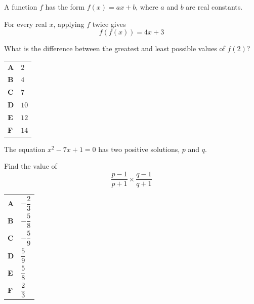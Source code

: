 \documentclass[11pt,a4paper]{article}
\begin{document}
\clearpage
\thispagestyle{djspaper}
\vspace*{8pt}
\begin{enumerate}[label=\textbf{\arabic*.},leftmargin=*,itemsep=0pt,start=12]
A function $f$ has the form $f(x)=ax+b$, where $a$ and $b$ are real constants.

For every real $x$, applying $f$ twice gives
\[
f(f(x))=4x+3
\]

What is the difference between the greatest and least possible values of $f(2)$?

\par\vspace*{12pt}
\begin{tabularx}{\linewidth}{@{}>{\bfseries}l Y@{}}
A &
$2$
\\[0.8em]
B &
$4$
\\[0.8em]
C &
$7$
\\[0.8em]
D &
$10$
\\[0.8em]
E &
$12$
\\[0.8em]
F &
$14$
\\
\end{tabularx}
\end{enumerate}
\clearpage
\thispagestyle{djspaper}
\vspace*{8pt}
\begin{enumerate}[label=\textbf{\arabic*.},leftmargin=*,itemsep=0pt,start=13]
\questionitem[Algebra]
The equation $x^2-7x+1=0$ has two positive solutions, $p$ and $q$.

Find the value of
\[ \frac{p-1}{p+1}\times\frac{q-1}{q+1}\]

\par\vspace*{12pt}
\begin{tabularx}{\linewidth}{@{}>{\bfseries}l Y@{}}
A &
$-\dfrac{2}{3}$
\\[0.8em]
B &
$-\dfrac{5}{8}$
\\[0.8em]
C &
$-\dfrac{5}{9}$
\\[0.8em]
D &
$\dfrac{5}{9}$
\\[0.8em]
E &
$\dfrac{5}{8}$
\\[0.8em]
F &
$\dfrac{2}{3}$
\\
\end{tabularx}
\end{enumerate}
\end{document}
